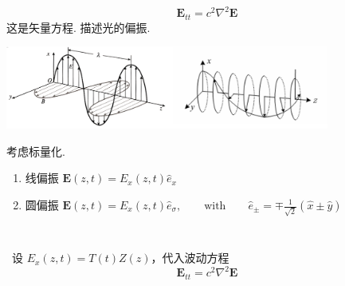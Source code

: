 \begin{frame}
 \frametitle{}
 \[\mathbf{E}_{tt} =c^2\nabla^2 \mathbf{E}\]
 这是矢量方程. 描述光的偏振. 
   \begin{center}
        \includegraphics[width=0.8\textwidth]{figs/10.png}
   \end{center}
 考虑标量化.
 \begin{enumerate}x
     \item 线偏振 $\mathbf{E}(z,t) = E_x(z,t) \hat{e}_x $ 
     \item 圆偏振 $\mathbf{E}(z,t) = E_x(z,t) \hat{e}_{\sigma}, \qquad \text{with} \qquad \hat{e}_{\pm}= \mp \frac{1}{\sqrt{2}} (\hat{x} \pm \hat{y}) $
 \end{enumerate}

\end{frame}

\begin{frame}
      \frametitle{}
      ~~\\
    \解  设 $\displaystyle  E_x(z,t)=T(t)Z(z) $，代入波动方程 
    \[\mathbf{E}_{tt} =c^2\nabla^2 \mathbf{E}\]
\end{frame}

